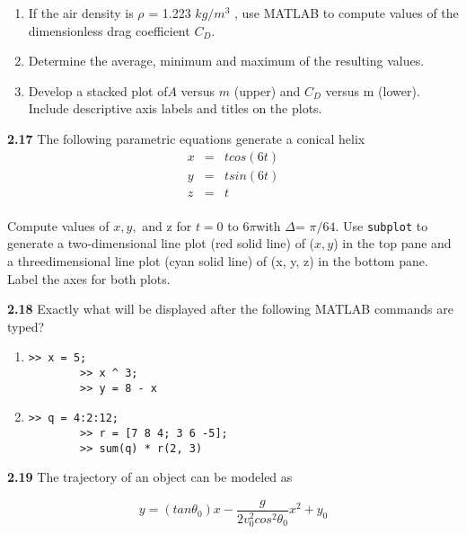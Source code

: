 \documentclass[../main.tex]{subfiles}
\begin{document}
\begin{multicols}{2}
\begin{flushleft}
\begin{scriptsize}
\begin{tabular}{cccccccc}
	\end{tabular}
\end{scriptsize}
\end{flushleft}


\begin{enumerate}[label=(\alph*)]
	\item If the air density is $\rho$ = 1.223 $kg/m^3$
	, use MATLAB to
	compute values of the dimensionless drag coefficient $C_D$.
	\item Determine the average, minimum and maximum of the
	resulting values.
	\item Develop a stacked plot of$ A$ versus $m$ (upper) and $C_D$
	versus m (lower). Include descriptive axis labels and
	titles on the plots.
\end{enumerate}


\textbf{2.17} The following parametric equations generate a conical
helix
\[ \begin{array}{lll}
	x &= &t cos(6t)\\
	y &= &t sin(6t)\\
	z &= &t\\

	
\end{array} \]

Compute values of $x, y,$ and z for $t = 0$ to $6\pi $with
$\Delta $= $\pi/64$. Use \texttt{subplot} to generate a two-dimensional
line plot (red solid line) of ($x, y$) in the top pane and a threedimensional line plot (cyan solid line) of (x, y, z) in the
bottom pane. Label the axes for both plots.


\textbf{2.18} Exactly what will be displayed after the following
MATLAB commands are typed?
\begin{enumerate}[label=(\alph*)]
		

	\item 
	\begin{lstlisting}[frame=none, numbers=none]
		>> x = 5;
		>> x ^ 3;
		>> y = 8 - x
	\end{lstlisting}
	\item 
	\begin{lstlisting}[frame=none, numbers=none]
		>> q = 4:2:12;
		>> r = [7 8 4; 3 6 -5];
		>> sum(q) * r(2, 3) 
	\end{lstlisting}
\end{enumerate}

\textbf{2.19} The trajectory of an object can be modeled as

$$y=(tan\theta_0  )x-\dfrac{g}{2v_0^2cos^2\theta_0 }x^2+y_0$$



\end{multicols}
\end{document}

